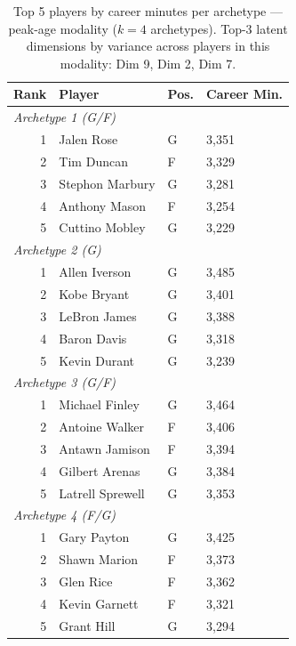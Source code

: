 \begin{table}[htbp]
  \centering\small
  \begin{tabular}{rlll}
    \toprule
    Rank & Player & Pos. & Career Min. \\
    \midrule
    \multicolumn{4}{l}{\textit{Archetype 1 (G/F)}} \\
    \midrule
    1 & Jalen Rose & G & 3,351 \\
    2 & Tim Duncan & F & 3,329 \\
    3 & Stephon Marbury & G & 3,281 \\
    4 & Anthony Mason & F & 3,254 \\
    5 & Cuttino Mobley & G & 3,229 \\
    \midrule[0.4pt]
    \multicolumn{4}{l}{\textit{Archetype 2 (G)}} \\
    \midrule
    1 & Allen Iverson & G & 3,485 \\
    2 & Kobe Bryant & G & 3,401 \\
    3 & LeBron James & G & 3,388 \\
    4 & Baron Davis & G & 3,318 \\
    5 & Kevin Durant & G & 3,239 \\
    \midrule[0.4pt]
    \multicolumn{4}{l}{\textit{Archetype 3 (G/F)}} \\
    \midrule
    1 & Michael Finley & G & 3,464 \\
    2 & Antoine Walker & F & 3,406 \\
    3 & Antawn Jamison & F & 3,394 \\
    4 & Gilbert Arenas & G & 3,384 \\
    5 & Latrell Sprewell & G & 3,353 \\
    \midrule[0.4pt]
    \multicolumn{4}{l}{\textit{Archetype 4 (F/G)}} \\
    \midrule
    1 & Gary Payton & G & 3,425 \\
    2 & Shawn Marion & F & 3,373 \\
    3 & Glen Rice & F & 3,362 \\
    4 & Kevin Garnett & F & 3,321 \\
    5 & Grant Hill & G & 3,294 \\
    \bottomrule
  \end{tabular}
  \caption{Top 5 players by career minutes per archetype --- peak-age modality ($k=4$ archetypes). Top-3 latent dimensions by variance across players in this modality: Dim 9, Dim 2, Dim 7.}
  \label{tab:arch_reps_peak_age}
\end{table}

